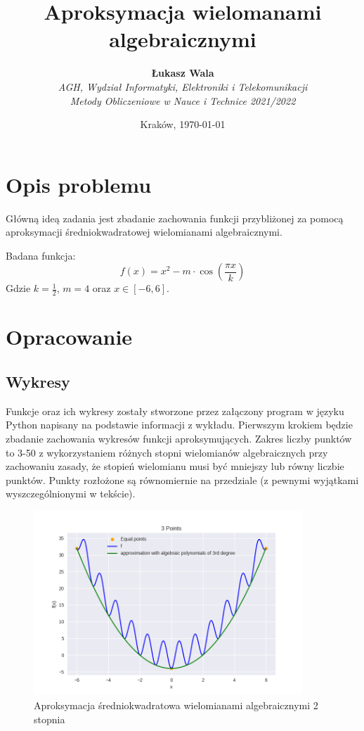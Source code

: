 \documentclass{article}
\title{Aproksymacja wielomanami algebraicznymi}
\author{\textbf{Łukasz Wala}\\
    \textit{AGH, Wydział Informatyki, Elektroniki i Telekomunikacji} \\
    \textit{Metody Obliczeniowe w Nauce i Technice 2021/2022}}
\date{Kraków, \today}
\begin{document}
\maketitle

\section{Opis problemu}
Główną ideą zadania jest zbadanie zachowania funkcji przybliżonej za pomocą aproksymacji
średniokwadratowej wielomianami algebraicznymi.

Badana funkcja:
\[f(x)=x^2-m\cdot\cos\left(\frac{\pi x}{k}\right)\]
Gdzie $k=\frac{1}{2}$, $m=4$ oraz $x\in [-6,6]$.

\section{Opracowanie}
\subsection{Wykresy}
Funkcje oraz ich wykresy zostały stworzone przez załączony program w języku Python napisany na podstawie informacji z wykładu. 
Pierwszym krokiem będzie zbadanie zachowania wykresów funkcji aproksymujących. Zakres liczby punktów to 3-50 z wykorzystaniem
różnych stopni wielomianów algebraicznych przy zachowaniu zasady, że stopień wielomianu musi być mniejszy lub równy liczbie punktów.
Punkty rozłożone są równomiernie na przedziale (z pewnymi wyjątkami wyszczególnionymi w tekście).

\begin{figure}[H]
    \centering
    \includegraphics[width=0.9\textwidth]{img/algpoly_2_3.png}
    \caption{Aproksymacja średniokwadratowa wielomianami algebraicznymi 2 stopnia}
\end{figure}
\end{document}
